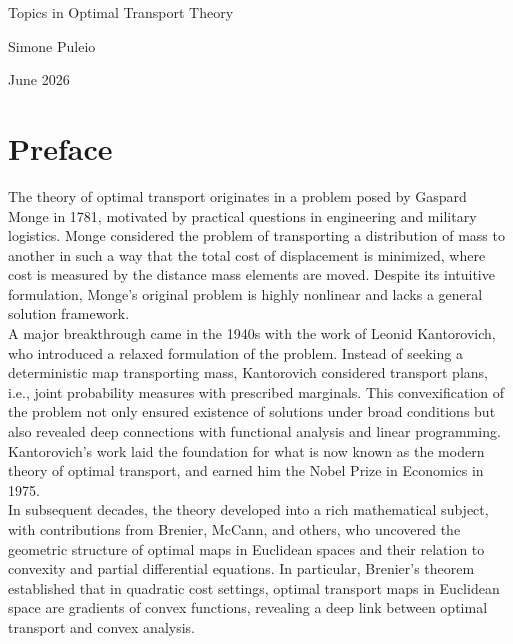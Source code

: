 \documentclass[a4paper,12pt]{article}
\begin{document}
\begin{titlepage}
    \centering
    \vspace*{\fill}
    {\Large Topics in Optimal Transport Theory\par}
    \vspace{0.5cm}

    {\large Simone Puleio\par}
    \vspace{0.3cm}

    {\large June 2026\par}

    \vspace*{\fill}
\end{titlepage}


\newpage
\tableofcontents

\newpage
\section*{Preface}
The theory of optimal transport originates in a problem posed by Gaspard Monge in 1781, motivated by practical questions in engineering and military logistics. Monge considered the problem of transporting a distribution of mass to another in such a way that the total cost of displacement is minimized, where cost is measured by the distance mass elements are moved. Despite its intuitive formulation, Monge’s original problem is highly nonlinear and lacks a general solution framework. \\

\noindent
A major breakthrough came in the 1940s with the work of Leonid Kantorovich, who introduced a relaxed formulation of the problem. Instead of seeking a deterministic map transporting mass, Kantorovich considered transport plans, i.e., joint probability measures with prescribed marginals. This convexification of the problem not only ensured existence of solutions under broad conditions but also revealed deep connections with functional analysis and linear programming. Kantorovich’s work laid the foundation for what is now known as the modern theory of optimal transport, and earned him the Nobel Prize in Economics in 1975. \\

\noindent
In subsequent decades, the theory developed into a rich mathematical subject, with contributions from Brenier, McCann, and others, who uncovered the geometric structure of optimal maps in Euclidean spaces and their relation to convexity and partial differential equations. In particular, Brenier’s theorem established that in quadratic cost settings, optimal transport maps in Euclidean space are gradients of convex functions, revealing a deep link between optimal transport and convex analysis.
\end{document}
